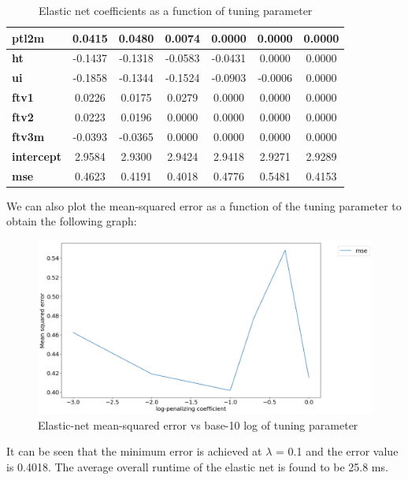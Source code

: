 \documentclass[a4paper,12pt]{article}
\begin{document}
\begin{table}[H]
\begin{tabular}{|l|c|c|c|c|c|c|}
\textbf{ptl2m}       & 0.0415          & 0.0480          & 0.0074          & 0.0000          & 0.0000          & 0.0000          \\ \hline
\textbf{ht}          & -0.1437         & -0.1318         & -0.0583         & -0.0431         & 0.0000          & 0.0000          \\ \hline
\textbf{ui}          & -0.1858         & -0.1344         & -0.1524         & -0.0903         & -0.0006         & 0.0000          \\ \hline
\textbf{ftv1}        & 0.0226          & 0.0175          & 0.0279          & 0.0000          & 0.0000          & 0.0000          \\ \hline
\textbf{ftv2}        & 0.0223          & 0.0196          & 0.0000          & 0.0000          & 0.0000          & 0.0000          \\ \hline
\textbf{ftv3m}       & -0.0393         & -0.0365         & 0.0000          & 0.0000          & 0.0000          & 0.0000          \\ \hline
\textbf{intercept}   & 2.9584          & 2.9300          & 2.9424          & 2.9418          & 2.9271          & 2.9289          \\ \hline
\textbf{mse}         & 0.4623          & 0.4191          & 0.4018          & 0.4776          & 0.5481          & 0.4153          \\ \hline
\end{tabular}
\caption{Elastic net coefficients as a function of tuning parameter}
\end{table}

\noindent We can also plot the mean-squared error as a function of the tuning parameter to obtain the following graph: 

\begin{figure}[H]
 \centering
 \includegraphics[scale=0.3]{mse-lambda-elastic_net.png}
  \caption{Elastic-net mean-squared error vs base-10 log of tuning parameter}
  \label{fig:neurons}
\end{figure}
It can be seen that the minimum error is achieved at $\lambda$ = 0.1 and the error value is 0.4018. The average overall runtime of the elastic net is found to be 25.8 ms.
\newpage
\end{document}
